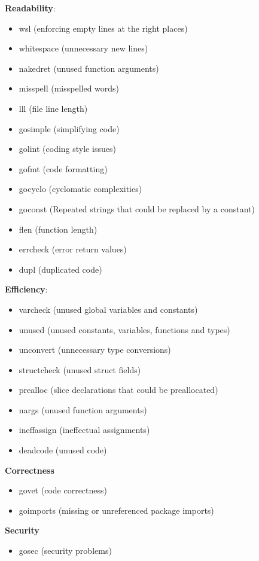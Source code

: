 \documentclass{seal_article}
\begin{document}
\noindent \textbf{Readability}:
\begin{itemize}
    \item wsl (enforcing empty lines at the right places)
    \item whitespace (unnecessary new lines)
    \item nakedret (unused function arguments)
    \item misspell (misspelled words)
    \item lll (file line length)
    \item gosimple (simplifying code)
    \item golint (coding style issues)
    \item gofmt (code formatting)
    \item gocyclo (cyclomatic complexities)
    \item goconst (Repeated strings that could be replaced by a constant)
    \item flen (function length)
    \item errcheck (error return values)
    \item dupl (duplicated code)
\end{itemize}

\noindent \textbf{Efficiency}:
\begin{itemize}
    \item varcheck (unused global variables and constants)
    \item unused (unused constants, variables, functions and types)
    \item unconvert (unnecessary type conversions)
    \item structcheck (unused struct fields)
    \item prealloc (slice declarations that could be preallocated)
    \item nargs (unused function arguments)
    \item ineffassign (ineffectual assignments)
    \item deadcode (unused code)
\end{itemize}

\noindent \textbf{Correctness}
\begin{itemize}
    \item govet (code correctness)
    \item goimports (missing or unreferenced package imports)
\end{itemize}{}

\noindent \textbf{Security}
\begin{itemize}
    \item gosec (security problems)
\end{itemize}
\end{document}
